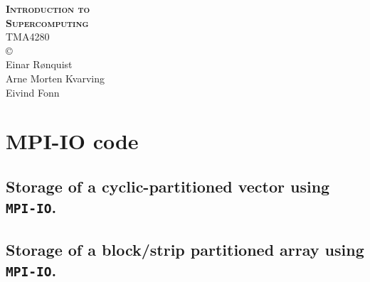 \documentclass[onecolumn, twoside, a4paper, 11pt]{memoir}
\begin{document}
\begin{titlingpage}
  \centering
  {\Huge \bfseries \scshape
    Introduction to \\[0.2\baselineskip] Supercomputing} \\[2\baselineskip]
  {\Large TMA4280} \\[0.7\textheight]
  \copyright \\
  Einar R{\o}nquist \\
  Arne Morten Kvarving \\
  Eivind Fonn
\end{titlingpage}












% 
% 

% 






% 
% 

\appendix

\chapter{MPI-IO code}

\section{Storage of a cyclic-partitioned vector using \texttt{MPI-IO}.}
\label{app:cyclicvector}


\newpage

\section{Storage of a block/strip partitioned array using \texttt{MPI-IO}.}
\label{app:darray}

\end{document}
